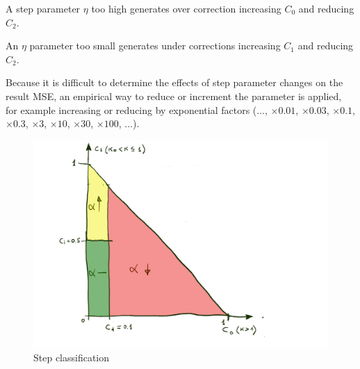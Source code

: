 \documentclass[]{article}
\begin{document}
A step parameter $ \eta $ too high generates over correction increasing $ C_0 $ and reducing $ C_2 $.

An $ \eta $ parameter too small generates under corrections increasing $ C_1 $ and reducing $ C_2 $.

Because it is difficult to determine the effects of step parameter changes on the result MSE, an empirical way to reduce or increment the parameter is applied, for example increasing or reducing by exponential factors ($ \dots $, $ \times 0.01 $, $ \times 0.03 $, $ \times 0.1$, $\times 0.3 $, $ \times 3 $, $ \times 10 $, $ \times 30$, $\times 100 $, $ \dots $).

\begin{figure}[ht]
	\centering
	\includegraphics[width=\linewidth]{ann.png}
	\caption{Step classification}
	\label{fig:steps}
\end{figure}
\end{document}
